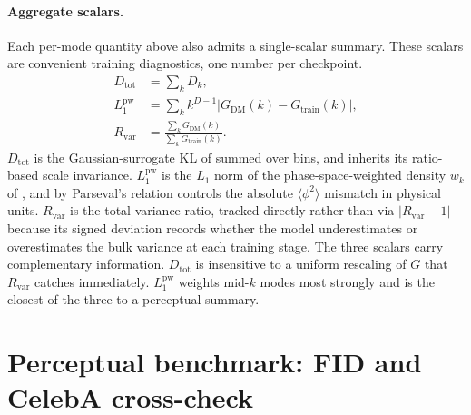 \paragraph{Aggregate scalars.}
Each per-mode quantity above also admits a single-scalar summary. These scalars are convenient training diagnostics, one number per checkpoint.
\begin{align}
D_{\mathrm{tot}} &= \sum_k D_k,
  \label{eq:Dtot}\\
L_1^{\mathrm{pw}} &= \sum_k k^{D-1}\bigl|G_{\mathrm{DM}}(k)-G_{\mathrm{train}}(k)\bigr|,
  \label{eq:L1pw}\\
R_{\mathrm{var}} &= \frac{\sum_k G_{\mathrm{DM}}(k)}{\sum_k G_{\mathrm{train}}(k)}.
  \label{eq:Rvar}
\end{align}
$D_{\mathrm{tot}}$ is the Gaussian-surrogate KL of  summed over bins, and inherits its ratio-based scale invariance. $L_1^{\mathrm{pw}}$ is the $L_1$ norm of the phase-space-weighted density $w_k$ of , and by Parseval's relation controls the absolute $\langle\phi^2\rangle$ mismatch in physical units. $R_{\mathrm{var}}$ is the total-variance ratio, tracked directly rather than via $|R_{\mathrm{var}}-1|$ because its signed deviation records whether the model underestimates or overestimates the bulk variance at each training stage. The three scalars carry complementary information. $D_{\mathrm{tot}}$ is insensitive to a uniform rescaling of $G$ that $R_{\mathrm{var}}$ catches immediately. $L_1^{\mathrm{pw}}$ weights mid-$k$ modes most strongly and is the closest of the three to a perceptual summary.


%

\section{Perceptual benchmark: FID and CelebA cross-check}
\label{app:fid_celeba}

